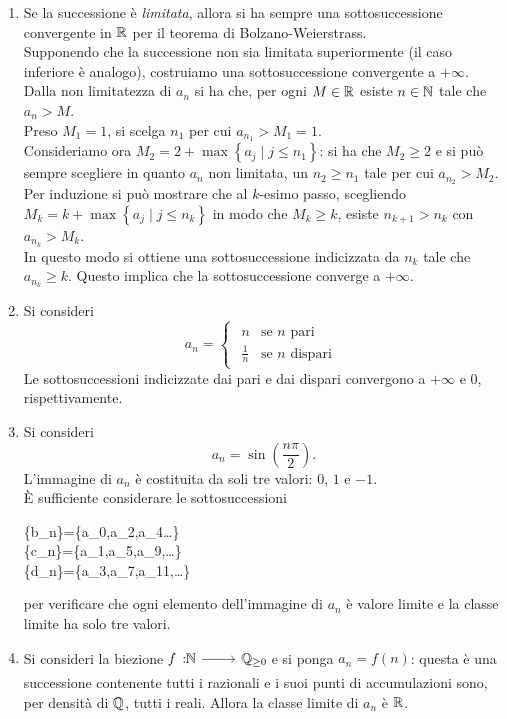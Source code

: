 \begin{solution}
\begin{enumerate}[label=\Roman*]
	\item Se la successione è \textit{limitata}, allora si ha sempre una sottosuccessione convergente in $\mathbb{R}$ per il teorema di Bolzano-Weierstrass.\\
	Supponendo che la successione non sia limitata superiormente (il caso inferiore è analogo), costruiamo una sottosuccessione convergente a $+\infty$. Dalla non limitatezza di $a_n$ si ha che, per ogni $M\in\mathbb{R}$ esiste $n\in\mathbb{N}$ tale che $a_n>M$.\\
	Preso $M_1=1$, si scelga $n_1$ per cui $a_{n_1}>M_1=1$.\\
	Consideriamo ora $M_2=2+\max\left\{a_j\mid j\leq n_1\right\}$: si ha che $M_2\geq 2$ e si può sempre scegliere in quanto $a_n$ non limitata, un $n_2\geq n_1$ tale per cui $a_{n_2}>M_2$.\\
	Per induzione si può mostrare che al $k$-esimo passo, scegliendo $M_k=k+\max\left\{a_j\mid j\leq n_k\right\}$ in modo che $M_k\geq k$, esiste $n_{k+1}>n_k$ con $a_{n_k}>M_k$.\\
	In questo modo si ottiene una sottosuccessione indicizzata da $n_k$ tale che $a_{n_k}\geq k$. Questo implica che la sottosuccessione converge a $+\infty$.
	\item Si consideri 
	\begin{equation*}
		a_n=\begin{cases}
			\begin{array}{ll}
				n&\text{se }n \text{ pari}\\
				\frac{1}{n}&\text{se }n \text{ dispari}
			\end{array}
		\end{cases}
	\end{equation*}
	Le sottosuccessioni indicizzate dai pari e dai dispari convergono a $+\infty$ e $0$, rispettivamente.
	\item Si consideri 
	\begin{equation*}
		a_n=\sin\left(\frac{n\pi}{2}\right).
	\end{equation*}
	L'immagine di $a_n$ è costituita da soli tre valori: $0$, $1$ e $-1$.\\
	È sufficiente considerare le sottosuccessioni
	\begin{flalign*}
		\left\{b_n\right\}=\left\{a_0,a_2,a_4\ldots\right\}\\
		\left\{c_n\right\}=\left\{a_1,a_5,a_9,\ldots\right\}\\
		\left\{d_n\right\}=\left\{a_3,a_7,a_{11},\ldots\right\}
	\end{flalign*}
	per verificare che ogni elemento dell'immagine di $a_n$ è valore limite e la classe limite ha solo tre valori.
	\item Si consideri la biezione $\funz{f}{\naturalset}{\rationalset_{\geq 0}}$ e si ponga $a_n=f\left(n\right)$: questa è una successione contenente tutti i razionali e i suoi punti di accumulazioni sono, per densità di $\mathbb{Q}$, tutti i reali. Allora la classe limite di $a_n$ è $\mathbb{R}$.
\end{enumerate}
\end{solution}
